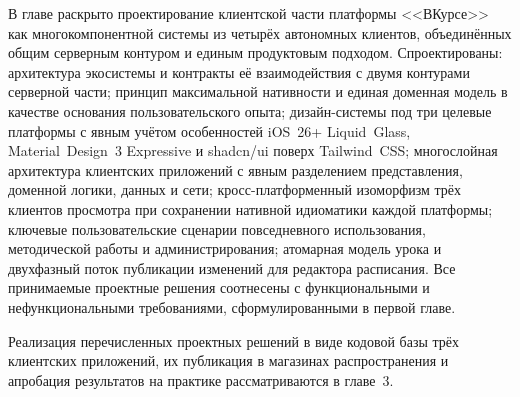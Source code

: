 В главе раскрыто проектирование клиентской части платформы <<ВКурсе>> как многокомпонентной системы из четырёх автономных клиентов, объединённых общим серверным контуром и единым продуктовым подходом. Спроектированы: архитектура экосистемы и контракты её взаимодействия с двумя контурами серверной части; принцип максимальной нативности и единая доменная модель в качестве основания пользовательского опыта; дизайн-системы под три целевые платформы с явным учётом особенностей iOS~26+ Liquid~Glass, Material~Design~3 Expressive и shadcn/ui поверх Tailwind~CSS; многослойная архитектура клиентских приложений с явным разделением представления, доменной логики, данных и сети; кросс-платформенный изоморфизм трёх клиентов просмотра при сохранении нативной идиоматики каждой платформы; ключевые пользовательские сценарии повседневного использования, методической работы и администрирования; атомарная модель урока и двухфазный поток публикации изменений для редактора расписания. Все принимаемые проектные решения соотнесены с функциональными и нефункциональными требованиями, сформулированными в первой главе.

Реализация перечисленных проектных решений в виде кодовой базы трёх клиентских приложений, их публикация в магазинах распространения и апробация результатов на практике рассматриваются в главе~3.
